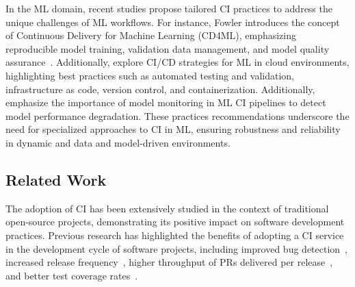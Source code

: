 In the ML domain, recent studies propose tailored CI practices to address the unique challenges of ML workflows. For instance, Fowler introduces the concept of Continuous Delivery for Machine Learning (\textsc{CD4ML}), emphasizing reproducible model training, validation data management, and model quality assurance~\citep{Fowler2019CD4ML}. Additionally, \cite{bagai2024implementing} explore CI/CD strategies for ML in cloud environments, highlighting best practices such as automated testing and validation, infrastructure as code, version control, and containerization. 
Additionally, \cite{garg2021continuous} emphasize the importance of model monitoring in ML CI pipelines to detect model performance degradation.
These practices recommendations underscore the need for specialized approaches to CI in ML, ensuring robustness and reliability in dynamic and data and model-driven environments.



\subsection{Related Work}

The adoption of CI has been extensively studied in the context of traditional open-source projects, demonstrating its positive impact on software development practices. 
Previous research has highlighted the benefits of adopting a CI service in the development cycle of software projects, including improved bug detection~\citep{vasilescu2015quality}, increased release frequency~\citep{hilton2016usage}, higher throughput of PRs delivered per release~\citep{bernardo2018studying}, and better test coverage rates~\citep{saraiva2023unveiling}. 

